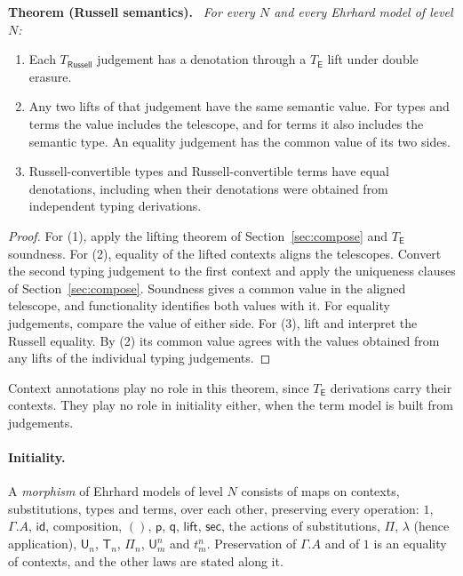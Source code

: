 \documentclass[11pt]{article}
\newenvironment{theorem}[1]{\par\medskip\noindent\textbf{Theorem #1.}\ \itshape}{\par\medskip}
\theoremstyle{definition}
\theoremstyle{remark}
\newcommand{\U}{\mathsf U}
\newcommand{\T}{\mathsf T}
\newcommand{\p}{\mathsf p}
\newcommand{\q}{\mathsf q}
\newcommand{\id}{\mathsf{id}}
\newcommand{\lift}{\mathsf{lift}}
\newcommand{\sect}{\mathsf{sec}}
\begin{document}
\begin{theorem}{(Russell semantics)}
For every $N$ and every Ehrhard model of level $N$:
\begin{enumerate}\setlength{\itemsep}{0pt}
\item Each $T_{\mathsf{Russell}}$ judgement has a denotation
through a $T_{\mathsf E}$ lift under double erasure.
\item Any two lifts of that judgement have the same semantic value.
For types and terms the value includes the telescope, and for terms
it also includes the semantic type. An equality judgement has the common
value of its two sides.
\item Russell-convertible types and Russell-convertible terms have
equal denotations, including when their denotations were obtained from
independent typing derivations.
\end{enumerate}
\end{theorem}
\begin{proof}
For (1), apply the lifting theorem of Section~\ref{sec:compose} and
$T_{\mathsf E}$ soundness. For (2), equality of the lifted contexts
aligns the telescopes. Convert the second typing judgement to the first
context and apply the uniqueness clauses of Section~\ref{sec:compose}.
Soundness gives a common value in the aligned telescope, and functionality
identifies both values with it. For equality judgements, compare the value
of either side. For (3), lift and interpret the Russell equality. By (2)
its common value agrees with the values obtained from any lifts of the
individual typing judgements.
\end{proof}

Context annotations play no role in this theorem, since $T_{\mathsf E}$
derivations carry their contexts. They play no role in initiality either,
when the term model is built from judgements.

\paragraph{Initiality.} A \emph{morphism} of Ehrhard models of level $N$
consists of maps on contexts, substitutions, types and terms, over each
other, preserving every operation: $1$, $\Gamma.A$, $\id$, composition,
$()$, $\p$, $\q$, $\lift$, $\sect$, the actions of substitutions, $\Pi$,
$\lambda$ (hence application), $\U_n$, $\T_n$, $\Pi_n$, $\U^n_m$ and
$t^n_m$. Preservation of $\Gamma.A$ and of $1$ is an equality of contexts,
and the other laws are stated along it.
\end{document}
